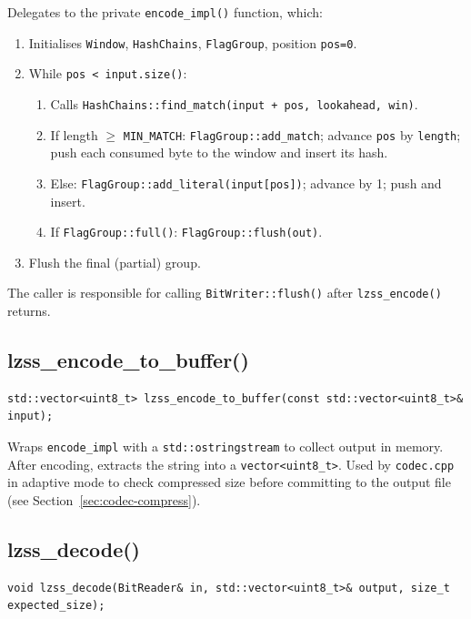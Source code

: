 Delegates to the private \texttt{encode\_impl()} function, which:

\begin{enumerate}
  \item Initialises \texttt{Window}, \texttt{HashChains}, \texttt{FlagGroup}, position \texttt{pos=0}.
  \item While \texttt{pos < input.size()}:
    \begin{enumerate}
      \item Calls \texttt{HashChains::find\_match(input + pos, lookahead, win)}.
      \item If length $\geq$ \texttt{MIN\_MATCH}: \texttt{FlagGroup::add\_match}; advance \texttt{pos}
            by \texttt{length}; push each consumed byte to the window and insert its hash.
      \item Else: \texttt{FlagGroup::add\_literal(input[pos])}; advance by 1; push and insert.
      \item If \texttt{FlagGroup::full()}: \texttt{FlagGroup::flush(out)}.
    \end{enumerate}
  \item Flush the final (partial) group.
\end{enumerate}

The caller is responsible for calling \texttt{BitWriter::flush()} after
\texttt{lzss\_encode()} returns.

\subsection{lzss\_encode\_to\_buffer()}

\begin{lstlisting}[style=cpp]
std::vector<uint8_t> lzss_encode_to_buffer(const std::vector<uint8_t>& input);
\end{lstlisting}

Wraps \texttt{encode\_impl} with a \texttt{std::ostringstream} to collect output in memory.
After encoding, extracts the string into a \texttt{vector\textless uint8\_t\textgreater}.
Used by \texttt{codec.cpp} in adaptive mode to check compressed size before committing
to the output file (see Section~\ref{sec:codec-compress}).

\subsection{lzss\_decode()}

\begin{lstlisting}[style=cpp]
void lzss_decode(BitReader& in, std::vector<uint8_t>& output, size_t expected_size);
\end{lstlisting}

